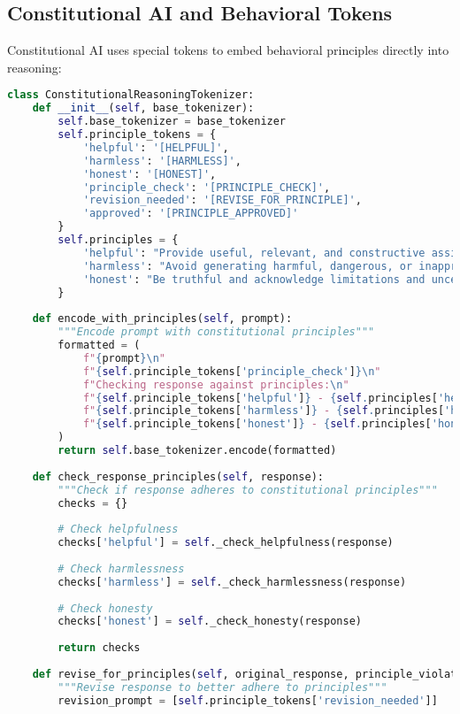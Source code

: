 \subsection{Constitutional AI and Behavioral Tokens}

Constitutional AI uses special tokens to embed behavioral principles directly into reasoning:

\begin{lstlisting}[language=Python, caption=Constitutional AI principle tokens]
class ConstitutionalReasoningTokenizer:
    def __init__(self, base_tokenizer):
        self.base_tokenizer = base_tokenizer
        self.principle_tokens = {
            'helpful': '[HELPFUL]',
            'harmless': '[HARMLESS]',
            'honest': '[HONEST]',
            'principle_check': '[PRINCIPLE_CHECK]',
            'revision_needed': '[REVISE_FOR_PRINCIPLE]',
            'approved': '[PRINCIPLE_APPROVED]'
        }
        self.principles = {
            'helpful': "Provide useful, relevant, and constructive assistance",
            'harmless': "Avoid generating harmful, dangerous, or inappropriate content",
            'honest': "Be truthful and acknowledge limitations and uncertainties"
        }
        
    def encode_with_principles(self, prompt):
        """Encode prompt with constitutional principles"""
        formatted = (
            f"{prompt}\n"
            f"{self.principle_tokens['principle_check']}\n"
            f"Checking response against principles:\n"
            f"{self.principle_tokens['helpful']} - {self.principles['helpful']}\n"
            f"{self.principle_tokens['harmless']} - {self.principles['harmless']}\n"
            f"{self.principle_tokens['honest']} - {self.principles['honest']}\n"
        )
        return self.base_tokenizer.encode(formatted)
    
    def check_response_principles(self, response):
        """Check if response adheres to constitutional principles"""
        checks = {}
        
        # Check helpfulness
        checks['helpful'] = self._check_helpfulness(response)
        
        # Check harmlessness
        checks['harmless'] = self._check_harmlessness(response)
        
        # Check honesty
        checks['honest'] = self._check_honesty(response)
        
        return checks
    
    def revise_for_principles(self, original_response, principle_violations):
        """Revise response to better adhere to principles"""
        revision_prompt = [self.principle_tokens['revision_needed']]
        

\end{lstlisting}
